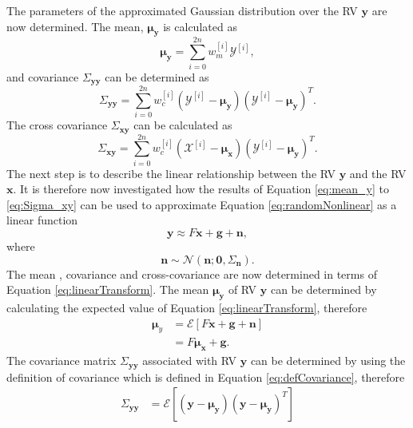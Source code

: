 \documentclass[12pt,oneside,openany,a4paper, %
afrikaans,english,
]{memoir}
\numberwithin{equation}{chapter}
\begin{document}
{The parameters of the approximated Gaussian distribution over the RV $\bm{y}$ are now determined. The mean, $\bm{\mu_{y}}$ is calculated as
\begin{equation}\label{eq:mean_y}
\bm{\mu}_{\bm{y}} = \sum_{i = 0}^{2n}w_m^{[i]}\mathcal{Y}^{[i]},
\end{equation}
and covariance $\Sigma_{\bm{yy}}$ can be determined as
\begin{equation}\label{eq:Sigma_yy}
\Sigma_{\bm{yy}} = \sum_{i=0}^{2n}w_c^{[i]}\left(\mathcal{Y}^{[i]} - \bm{\mu_{y}}\right) \left(\mathcal{Y}^{[i]} - \bm{\mu_{y}}\right)^T.
\end{equation}
The cross covariance $\Sigma_{\bm{xy}}$ can be calculated as
\begin{equation}\label{eq:Sigma_xy}
\Sigma_{\bm{xy}}= \sum_{i=0}^{2n}w_c^{[i]}\left(\mathcal{X}^{[i]} - \bm{\mu_{x}}\right) \left(\mathcal{Y}^{[i]} - \bm{\mu_{y}}\right)^T.
\end{equation}
The next step is to describe the linear relationship between the RV $\bm{y}$ and the RV $\bm{x}$.
It is therefore now investigated how the results of Equation \ref{eq:mean_y} to \ref{eq:Sigma_xy} can be used to approximate Equation \ref{eq:randomNonlinear} as a linear function 
\begin{equation}\label{eq:linearTransform}
\bm{y} \approx F\bm{x} + \bm{g} + \bm{n},
\end{equation}
where
\begin{equation}
\bm{n} \sim \mathcal{N}(\bm{n}; \bm{0}, \Sigma_{\bm{n}}).
\end{equation}
The mean , covariance and cross-covariance are now determined in terms of Equation \ref{eq:linearTransform}. The mean $\bm{\mu_y}$ of RV $\bm{y}$ can be determined by calculating the expected value of Equation \ref{eq:linearTransform}, therefore
\begin{equation}\label{eq:mean_y2}
\begin{split}
\bm{\mu}_y & = \mathcal{E}[F\bm{x} + \bm{g} + \bm{n}]\\
& = F\bm{\mu_x} + \bm{g}.
\end{split}
\end{equation}
The covariance matrix $\Sigma_{\bm{yy}}$ associated with RV $\bm{y}$ can be determined by using the definition of covariance which is defined in Equation \ref{eq:defCovariance}, therefore
\begin{equation}
\begin{split}
\Sigma_{\bm{yy}} & = \mathcal{E}\left[(\bm{y} - \bm{\mu_y})(\bm{y} - \bm{\mu_y})^T\right]\\

\end{split}
\end{equation}}
\end{document}
